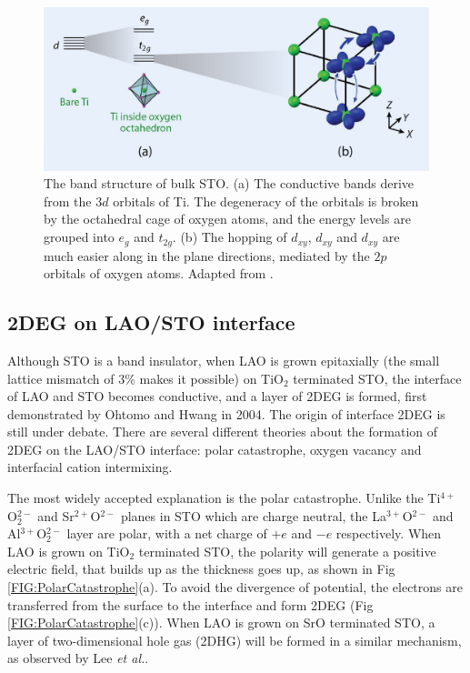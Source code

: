 \documentclass[pdflatex, sectionletters, 12pt]{pittetd}    %
\begin{document}
\begin{figure}[h!]
	\centering
	\includegraphics[width=.90\textwidth]{Drawing/STOBand.pdf}
	\caption{The band structure of bulk STO. (a) The conductive bands derive from the $3d$ orbitals of Ti. The degeneracy of the orbitals is broken by the octahedral cage of oxygen atoms, and the energy levels are grouped into $e_g$ and $t_{2g}$. (b) The hopping of $d_{xy}$, $d_{xy}$ and $d_{xy}$ are much easier along in the plane directions, mediated by the $2p$ orbitals of oxygen atoms. Adapted from \cite{sulpizio2014nanoscale}.}
	\label{FIG:STOBand}
\end{figure}

\subsection{2DEG on LAO/STO interface}

Although STO is a band insulator, when LAO is grown epitaxially (the small lattice mismatch of 3\% makes it possible) on TiO$_2$ terminated STO, the interface of LAO and STO becomes conductive, and a layer of 2DEG is formed, first demonstrated by Ohtomo and Hwang in 2004\cite{ohtomo2004high}. The origin of interface 2DEG is still under debate. There are several different theories about the formation of 2DEG on the LAO/STO interface: polar catastrophe\cite{nakagawa2006some}, oxygen vacancy\cite{kalabukhov2007effect} and interfacial cation intermixing\cite{willmott2007structural}. 

The most widely accepted explanation is the polar catastrophe. Unlike the Ti$^{4+}$O$_2^{2-}$ and Sr$^{2+}$O$^{2-}$ planes in STO which are charge neutral, the La$^{3+}$O$^{2-}$ and Al$^{3+}$O$_2^{2-}$ layer are polar, with a net charge of $+e$ and $-e$ respectively. When LAO is grown on TiO$_2$ terminated STO, the polarity will generate a positive electric field, that builds up as the thickness goes up, as shown in Fig \ref{FIG:PolarCatastrophe}(a). To avoid the divergence of potential, the electrons are transferred from the surface to the interface and form 2DEG (Fig \ref{FIG:PolarCatastrophe}(c)). When LAO is grown on SrO terminated STO, a layer of two-dimensional hole gas (2DHG) will be formed in a similar mechanism, as observed by Lee \textit{et al.}\cite{lee2018direct}.
\\
\end{document}
